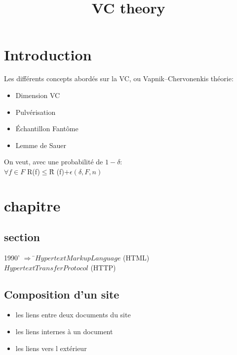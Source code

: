 \documentclass[a4paper]{report}
\title{VC theory}
\begin{document}
\maketitle
\tableofcontents



\chapter*{Introduction}
Les différents concepts abordés sur la VC, ou Vapnik–Chervonenkis théorie:
\begin{itemize}
\item Dimension VC
\item Pulvérisation
\item Échantillon Fantôme
\item Lemme de Sauer
\end{itemize}
On veut, avec une probabilité de $1 - \delta$:\\
$ \forall f \in F $ R(f)$ \leq $\^R (f)$ + \epsilon(\delta, F, n) $\\

\chapter*{chapitre}
\section*{section}
\begin{tabbing}
1990' $ \Rightarrow$ \=$Hypertext Markup Language$ (HTML)\\
       \>$Hypertext Transfer Protocol$ (HTTP)\\
\end{tabbing}

\section*{Composition d'un site\\}
\begin{itemize}
\item les liens entre deux documents du site
\item les liens internes à un document
\item les liens vers l extérieur
\end{itemize}
\end{document}
